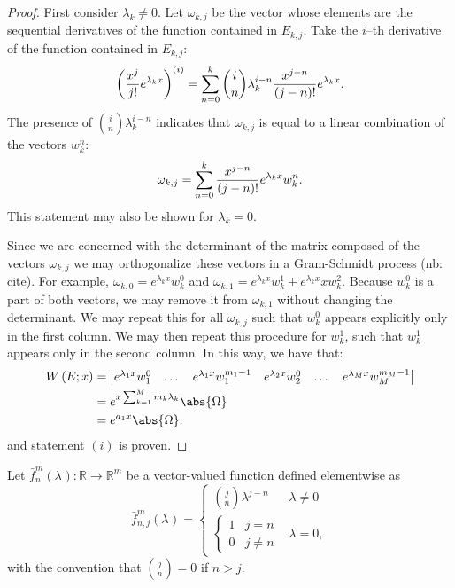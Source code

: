 \documentclass{article}
\begin{document}
\begin{proof}
First consider $\lambda_k \neq 0$.
Let $\omega_{k,j}$ be the vector whose elements are the sequential derivatives of the function contained in $E_{k,j}$.
Take the $i$--th derivative of the function contained in $E_{k,j}$:
\begin{equation*}
\left ( \frac{x^j}{j!} e^{\lambda_k x} \right )^{(i)} = \sum_{n=0}^k \binom{i}{n} \lambda_k^{i-n} \frac{x^{j-n}}{(j-n)!} e^{\lambda_k x} .
\end{equation*}
The presence of $\binom{i}{n} \lambda_k^{i-n}$ indicates that $\omega_{k,j}$ is equal to a linear combination of the vectors $w_k^n$:
\begin{equation*}
\omega_{k,j} = \sum_{n=0}^k \frac{x^{j-n}}{(j-n)!} e^{\lambda_k x} w_k^n .
\end{equation*}
This statement may also be shown for $\lambda_k = 0$.

Since we are concerned with the determinant of the matrix composed of the vectors $\omega_{k,j}$ we may orthogonalize these vectors in a Gram-Schmidt process (nb: cite).
For example, $\omega_{k,0} = e^{\lambda_k x} w_k^0$ and $\omega_{k,1} = e^{\lambda_k x} w_k^1 + e^{\lambda_k x} x w_k^2$.
Because $w_k^0$ is a part of both vectors, we may remove it from $\omega_{k,1}$ without changing the determinant.
We may repeat this for all $\omega_{k,j}$ such that $w_k^0$ appears explicitly only in the first column.
We may then repeat this procedure for $w_k^1$, such that $w_k^1$ appears only in the second column.
In this way, we have that:
\begin{equation*}
\begin{split}
\W{E}{x} & = \begin{vmatrix} e^{\lambda_1 x} w_1^0 & \dots & e^{\lambda_1 x} w_1^{m_1-1} & e^{\lambda_2 x} w_2^0 & \dots & e^{\lambda_M x} w_M^{m_M-1} \end{vmatrix} \\
		 & = e^{x \sum_{k=1}^M m_k \lambda_k} \abs{\Omega} \\
		 & = e^{a_1 x} \abs{\Omega}.
\end{split}
\end{equation*}
and statement $(i)$ is proven.
\end{proof}


\newcommand{\fmn}[3]{\bar{f}^{#2}_{#1}(\lambda_{#3})}

\begin{defn}
Let $\fmn{n}{m}{}:\mathbb{R} \rightarrow \mathbb{R}^m$ be a vector-valued function defined elementwise as
\begin{equation*}
\fmn{n,j}{m}{} = \begin{cases} \binom{j}{n} \lambda^{j-n} & \lambda \neq 0 \\
\begin{cases} 1 & j = n \\ 0 & j \neq n \end{cases} & \lambda = 0, \end{cases}
\end{equation*}
with the convention that $\binom{j}{n} = 0$ if $n > j$.
\end{defn}
\end{document}
